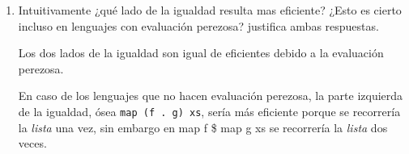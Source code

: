 \documentclass[11pt,letterpaper]{article}
\begin{document}
\begin{enumerate}
\begin{enumerate}[label=\alph*)]
\item Intuitivamente ¿qué lado de la igualdad resulta mas eficiente? ¿Esto es cierto incluso en
lenguajes con evaluación perezosa? justifica ambas respuestas.

\textcolor{WildStrawberry}{Los dos lados de la igualdad son igual de eficientes debido
a la evaluación perezosa.}

En caso de los lenguajes que no hacen evaluación perezosa, la parte izquierda de la igualdad,
ósea \textcolor{WildStrawberry}{\texttt{map (f . g) xs}}, sería más eficiente porque se recorrería
la \textit{lista} una vez, sin embargo en \textcolor{WildStrawberry}{map f \$ map g xs} se
recorrería la \textit{lista} dos veces.

\end{enumerate}

\end{enumerate}



\end{document}
